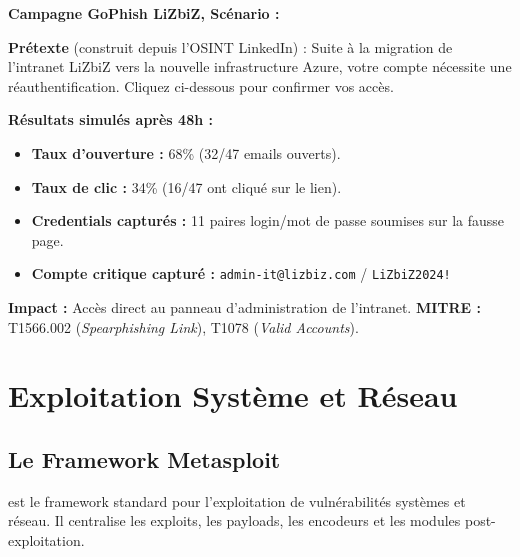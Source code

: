 \begin{boxlizbiz}
\textbf{Campagne GoPhish LiZbiZ, Scénario :}

\medskip
\textbf{Prétexte} (construit depuis l'OSINT LinkedIn) :
\og{}Suite à la migration de l'intranet LiZbiZ vers la nouvelle
infrastructure Azure, votre compte nécessite une réauthentification.
Cliquez ci-dessous pour confirmer vos accès.\fg{}

\medskip
\textbf{Résultats simulés après 48h :}
\begin{itemize}
    \item \textbf{Taux d'ouverture :} 68\% (32/47 emails ouverts).
    \item \textbf{Taux de clic :} 34\% (16/47 ont cliqué sur le lien).
    \item \textbf{Credentials capturés :} 11 paires
          login/mot de passe soumises sur la fausse page.
    \item \textbf{Compte critique capturé :}
          \texttt{admin-it@lizbiz.com} / \texttt{LiZbiZ2024!}
\end{itemize}

\textbf{Impact :} Accès direct au panneau d'administration de l'intranet.
\textbf{MITRE :} T1566.002 (\textit{Spearphishing Link}), T1078
(\textit{Valid Accounts}).
\end{boxlizbiz}

\section{Exploitation Système et Réseau}
\label{sec:exploit_sys}

\subsection{Le Framework Metasploit}
\label{subsec:metasploit}

 est le framework standard pour l'exploitation de
vulnérabilités systèmes et réseau. Il centralise les exploits, les payloads,
les encodeurs et les modules post-exploitation.

